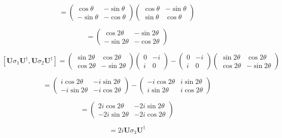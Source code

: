 \documentclass[12pt]{article}
\begin{document}
\[
    =
    \begin{pmatrix}
        \cos \theta  & -\sin \theta \\
        -\sin \theta & -\cos \theta
    \end{pmatrix}
    \begin{pmatrix}
        \cos \theta & -\sin \theta \\
        \sin \theta & \cos \theta
    \end{pmatrix}
\]

\[
    =
    \begin{pmatrix}
        \cos 2 \theta  & -\sin 2 \theta \\
        -\sin 2 \theta & -\cos 2 \theta
    \end{pmatrix}
\]

\[
    \left[\mathbf{U}\sigma_1\mathbf{U^\dagger}, \mathbf{U}\sigma_2\mathbf{U^\dagger}\right] =
    \begin{pmatrix}
        \sin 2\theta  & \cos 2 \theta \\
        \cos 2 \theta & -\sin 2\theta
    \end{pmatrix}
    \begin{pmatrix}
        0 & -i \\
        i & 0
    \end{pmatrix}
    -
    \begin{pmatrix}
        0 & -i \\
        i & 0
    \end{pmatrix}
    \begin{pmatrix}
        \sin 2\theta  & \cos 2 \theta \\
        \cos 2 \theta & -\sin 2\theta
    \end{pmatrix}
\]

\[
    =
    \begin{pmatrix}
        i\cos 2\theta  & -i\sin 2\theta \\
        -i\sin 2\theta & -i\cos 2\theta
    \end{pmatrix}
    -
    \begin{pmatrix}
        -i\cos 2\theta & i\sin 2\theta \\
        i\sin 2\theta  & i\cos 2\theta
    \end{pmatrix}
\]

\[
    =
    \begin{pmatrix}
        2i\cos 2\theta  & -2i\sin 2\theta \\
        -2i\sin 2\theta & -2i\cos 2\theta
    \end{pmatrix}
\]

\[
    = 2i\mathbf{U}\sigma_3\mathbf{U^\dagger}
\]

\newpage


\nocite{El-Deeb_PEU-356_Assignments}
\end{document}
